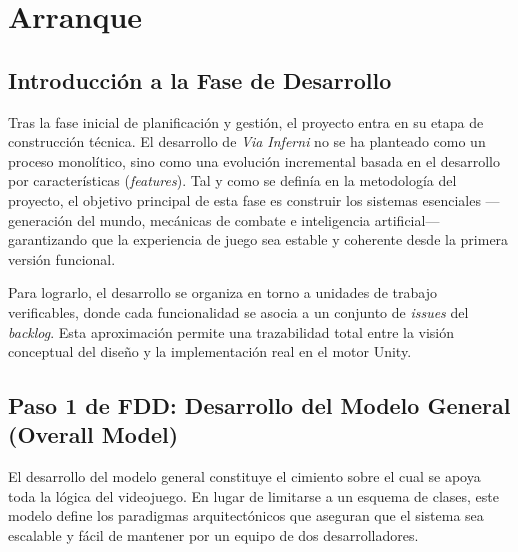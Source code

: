 \chapter{Arranque}

\begin{abstract}
Este capítulo marca el inicio de la sección de Desarrollo del Proyecto, actuando como el marco de referencia técnica para todas las fases posteriores de implementación. En él se formalizan los dos primeros pasos de la metodología \textit{Feature Driven Development} (FDD): la creación del \textit{Overall Model} y la elaboración de la \textit{Feature List}. A diferencia de una fase de diseño estática, este arranque establece las bases de una arquitectura orientada a datos y una estrategia de desarrollo basada en funcionalidades modulares. Se detalla aquí la lógica de generación procedural mediante grafos y celdas, así como la estructura de seguimiento que permitirá transformar los requisitos en un producto funcional a través de ciclos iterativos.
\end{abstract}

\section{Introducción a la Fase de Desarrollo}
Tras la fase inicial de planificación y gestión, el proyecto entra en su etapa de construcción técnica. El desarrollo de \textit{Via Inferni} no se ha planteado como un proceso monolítico, sino como una evolución incremental basada en el desarrollo por características (\textit{features}). Tal y como se definía en la metodología del proyecto, el objetivo principal de esta fase es construir los sistemas esenciales —generación del mundo, mecánicas de combate e inteligencia artificial— garantizando que la experiencia de juego sea estable y coherente desde la primera versión funcional.

Para lograrlo, el desarrollo se organiza en torno a unidades de trabajo verificables, donde cada funcionalidad se asocia a un conjunto de \textit{issues} del \textit{backlog}. Esta aproximación permite una trazabilidad total entre la visión conceptual del diseño y la implementación real en el motor Unity.

\section{Paso 1 de FDD: Desarrollo del Modelo General (Overall Model)}
El desarrollo del modelo general constituye el cimiento sobre el cual se apoya toda la lógica del videojuego. En lugar de limitarse a un esquema de clases, este modelo define los paradigmas arquitectónicos que aseguran que el sistema sea escalable y fácil de mantener por un equipo de dos desarrolladores.

